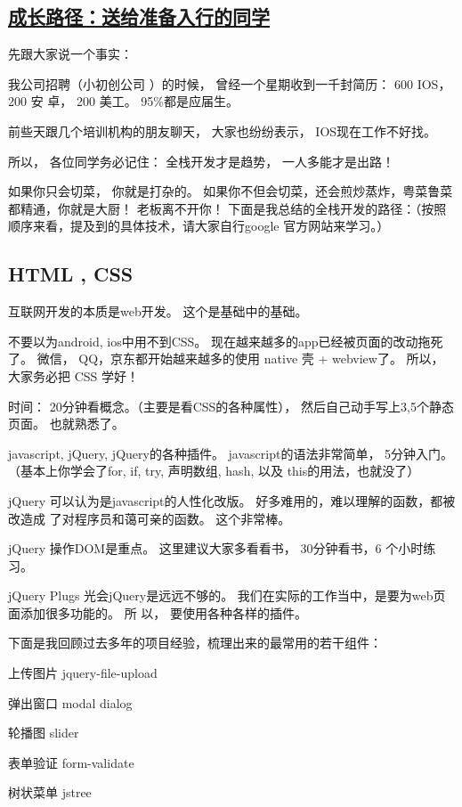 \documentclass[11pt]{ctexart}
\begin{document}
{{{{\subsection{\href{http://www.imooc.com/article/12768}{成长路径：送给准备入行的同学}}
\label{sec:org461c55a}
先跟大家说一个事实：

我公司招聘（小初创公司 ）的时候， 曾经一个星期收到一千封简历： 600 IOS， 200 安
卓， 200 美工。 95\%都是应届生。


前些天跟几个培训机构的朋友聊天， 大家也纷纷表示， IOS现在工作不好找。

所以， 各位同学务必记住： 全栈开发才是趋势， 一人多能才是出路！

如果你只会切菜， 你就是打杂的。
如果你不但会切菜，还会煎炒蒸炸，粤菜鲁菜都精通，你就是大厨！ 老板离不开你！
下面是我总结的全栈开发的路径：（按照顺序来看，提及到的具体技术，请大家自行google
官方网站来学习。）


\subsection{HTML , CSS}
\label{sec:orgd8b575b}
互联网开发的本质是web开发。 这个是基础中的基础。

不要以为android, ios中用不到CSS。 现在越来越多的app已经被页面的改动拖死了。 微信，
QQ，京东都开始越来越多的使用 native 壳 + webview了。 所以， 大家务必把 CSS 学好！


时间： 20分钟看概念。（主要是看CSS的各种属性）， 然后自己动手写上3,5个静态页面。 也就熟悉了。

javascript, jQuery, jQuery的各种插件。
javascript的语法非常简单， 5分钟入门。 （基本上你学会了for, if, try, 声明数组,
hash, 以及 this的用法，也就没了）


jQuery 可以认为是javascript的人性化改版。 好多难用的，难以理解的函数，都被改造成
了对程序员和蔼可亲的函数。 这个非常棒。


jQuery 操作DOM是重点。 这里建议大家多看看书， 30分钟看书，6 个小时练习。

jQuery Plugs
光会jQuery是远远不够的。 我们在实际的工作当中，是要为web页面添加很多功能的。 所
以， 要使用各种各样的插件。


下面是我回顾过去多年的项目经验，梳理出来的最常用的若干组件：

上传图片 jquery-file-upload

弹出窗口 modal dialog

轮播图 slider

表单验证 form-validate

树状菜单 jstree

}}}}
\end{document}
